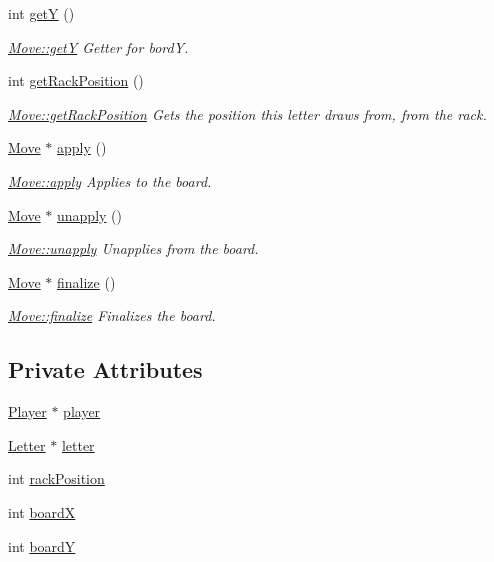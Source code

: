 \begin{DoxyCompactItemize}
int \hyperlink{class_move_af388d15d91f61a1f909998f50988ac1a}{get\-Y} ()
\begin{DoxyCompactList}\small\item\em \hyperlink{class_move_af388d15d91f61a1f909998f50988ac1a}{Move\-::get\-Y} Getter for bord\-Y. \end{DoxyCompactList}\item 
int \hyperlink{class_move_ad78bb76d9b590cdb98aa4d4a3088e69d}{get\-Rack\-Position} ()
\begin{DoxyCompactList}\small\item\em \hyperlink{class_move_ad78bb76d9b590cdb98aa4d4a3088e69d}{Move\-::get\-Rack\-Position} Gets the position this letter draws from, from the rack. \end{DoxyCompactList}\item 
\hyperlink{class_move}{Move} $\ast$ \hyperlink{class_move_af3c01fad2f5724f497a2d9eb165be470}{apply} ()
\begin{DoxyCompactList}\small\item\em \hyperlink{class_move_af3c01fad2f5724f497a2d9eb165be470}{Move\-::apply} Applies to the board. \end{DoxyCompactList}\item 
\hyperlink{class_move}{Move} $\ast$ \hyperlink{class_move_a2ca5c1f8be73c0e6c0ec4b359061a1e2}{unapply} ()
\begin{DoxyCompactList}\small\item\em \hyperlink{class_move_a2ca5c1f8be73c0e6c0ec4b359061a1e2}{Move\-::unapply} Unapplies from the board. \end{DoxyCompactList}\item 
\hyperlink{class_move}{Move} $\ast$ \hyperlink{class_move_a315c3ce190a5a9ef24cf6cc5916e81b1}{finalize} ()
\begin{DoxyCompactList}\small\item\em \hyperlink{class_move_a315c3ce190a5a9ef24cf6cc5916e81b1}{Move\-::finalize} Finalizes the board. \end{DoxyCompactList}\end{DoxyCompactItemize}
\subsection*{Private Attributes}
\begin{DoxyCompactItemize}
\item 
\hyperlink{class_player}{Player} $\ast$ \hyperlink{class_move_a1fbc388e091cd5639b755ebca2a8f90b}{player}
\item 
\hyperlink{class_letter}{Letter} $\ast$ \hyperlink{class_move_a80fe73cecfae0270265a8d5a50a9739f}{letter}
\item 
int \hyperlink{class_move_a8a1c46caedcac551e4a6714b7b729a41}{rack\-Position}
\item 
int \hyperlink{class_move_ad3fa58a6db17896f2a83cbcc77ceb998}{board\-X}
\item 
int \hyperlink{class_move_ac953ac3b9b8ca529d1be967c7712ae05}{board\-Y}
\end{DoxyCompactItemize}


